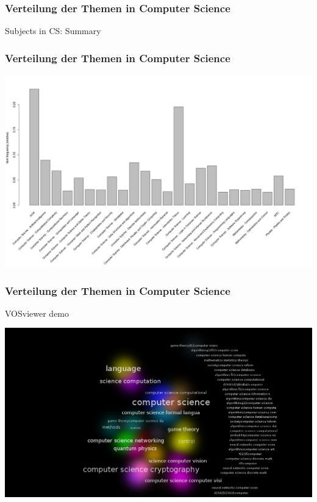 \documentclass[12pt, xcolor=table]{beamer}
\begin{document}
\begin{frame}[fragile]
    \frametitle{Verteilung der Themen in Computer Science}
    \begin{block}{Subjects in CS: Summary}
    	
	\end{block}
\end{frame}

\begin{frame}
	\frametitle{Verteilung der Themen in Computer Science}
	\begin{center}
		\includegraphics[scale=0.25]{../../visual/csFrequent_filter_acm_and_msc.png}
	\end{center}
\end{frame}
\begin{frame}
	\frametitle{Verteilung der Themen in Computer Science}
    VOSviewer demo
	\begin{center}
		\includegraphics[scale=0.25]{../../visual/cs_subs_cluster_density.png}
	\end{center}
\end{frame}
\end{document}
